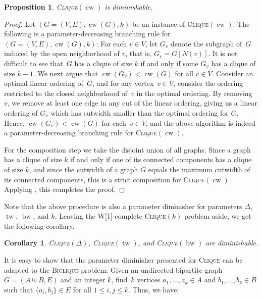 \documentclass[11pt,a4,USenglish]{article}
\newcommand{\prob}[1]{\textsc{#1}}
\newcommand{\pprob}[2]{\prob{#1}$(#2)$}
\newcommand{\W}[1]{\textnormal{W[#1]}}
\DeclareMathOperator{\tw}{tw}
\DeclareMathOperator{\bw}{bw}
\DeclareMathOperator{\cw}{cw}
\theoremstyle{definition}
\theoremstyle{plain}
\newtheorem{corollary}{Corollary}
\newtheorem{proposition}{Proposition}
\theoremstyle{remark}
\begin{document}
\begin{proposition}
\label{lem:cliquecw}
\pprob{Clique}{\cw} is diminishable.
\end{proposition}
\begin{proof}
Let $(G=(V, E), \cw(G), k)$ be an instance of \pprob{Clique}{\cw}. 
The following is a parameter-decreasing branching rule for $(G=(V, E),\cw(G),k)$: 
For each $v \in V$, let $G_v$ denote the subgraph of~$G$ induced by the open neighborhood of $v$, that is, $G_v=G[N(v)]$.
It is not difficult to see that~$G$ has a clique of size $k$ if and only if some $G_v$ has a clique of size $k-1$. We next argue that $\cw(G_v) < \cw(G)$ for all $v \in V$. 
Consider an optimal linear ordering of~$G$, and for any vertex~$v \in V$, consider the ordering restricted to the closed neighborhood of~$v$ in the optimal ordering. 
%
By removing~$v$, we remove at least one edge in any cut of the linear ordering, giving us a linear ordering of $G_v$ which has cutwidth smaller than the optimal ordering for $G$. 
Hence, $\cw(G_v) < \cw(G)$ for each~$v \in V$, and the above algorithm is indeed a parameter-decreasing branching rule for \pprob{Clique}{\cw}.

For the composition step we take the disjoint union of all graphs. Since a graph has a clique of size $k$ if and only if one of its connected components has a clique of size $k$, and since the cutwidth of a graph $G$ equals the maximum cutwidth of its connected components, this is a strict composition for \pprob{Clique}{\cw}. 
Applying , this completes the proof.
\end{proof}
%
\iflong{}
Note that the above procedure is also a parameter diminisher for parameters $\Delta$, $\tw$, $\bw$, and $k$. 
Leaving the \W{1}-complete \pprob{Clique}{k} problem aside, we get the following corollary.
\begin{corollary}
  \pprob{Clique}{\Delta}, \pprob{Clique}{\tw}, and \pprob{Clique}{\bw} are diminishable.
  \end{corollary}

  It is easy to show that the parameter diminisher presented for \prob{Clique} can be adapted to the \textsc{Biclique} problem: Given an undirected bipartite graph $G=(A \uplus B, E)$ and an integer $k$, find~$k$ vertices $a_1,\ldots,a_k \in A$ and $b_1,\ldots,b_k\in B$ such that $\{a_i,b_j\} \in E$ for all $1 \leq i , j \leq k$. Thus, we have:
\end{document}
